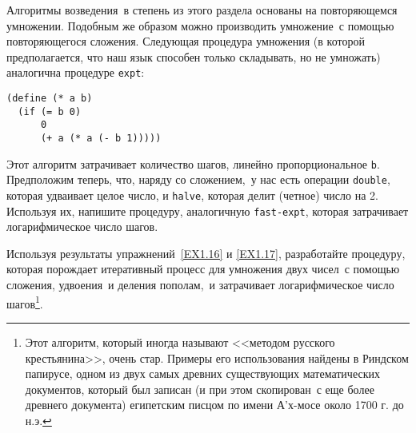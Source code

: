 \begin{exercise}{1.17}\label{EX1.17}%
Алгоритмы возведения~в степень из этого раздела
основаны на повторяющемся умножении.  Подобным же образом можно
производить умножение~с помощью повторяющегося сложения.  Следующая
процедура умножения (в которой предполагается, что наш язык способен
только складывать, но не умножать) аналогична процедуре
{\tt expt}:

\begin{Verbatim}[fontsize=\small]
(define (* a b)
  (if (= b 0)
      0
      (+ a (* a (- b 1)))))
\end{Verbatim}
Этот алгоритм затрачивает количество шагов, линейно пропорциональное
{\tt b}.  Предположим теперь, что, наряду со сложением,~у нас
есть операции {\tt double}, которая удваивает целое число, и
{\tt halve}, которая делит (четное) число на 2. Используя их,
напишите процедуру, аналогичную {\tt fast-expt}, которая
затрачивает логарифмическое число шагов.
\end{exercise}

\begin{exercise}{1.18}\label{EX1.18}%
Используя результаты упражнений~\ref{EX1.16} и
\ref{EX1.17}, разработайте процедуру, которая порождает
итеративный процесс для умножения двух чисел~с помощью сложения,
удвоения~и деления пополам,~и затрачивает логарифмическое число
шагов\footnote{%
%
%
Этот
  алгоритм, который иногда называют <<методом
  русского крестьянина>>, очень стар.  Примеры его использования найдены
 в Риндском папирусе, одном из двух самых древних существующих
  математических документов, который был записан (и при этом скопирован~с еще
  более древнего документа) египетским писцом по имени А'х-мосе около
  1700 г. до
  н.э.}.
\end{exercise}

